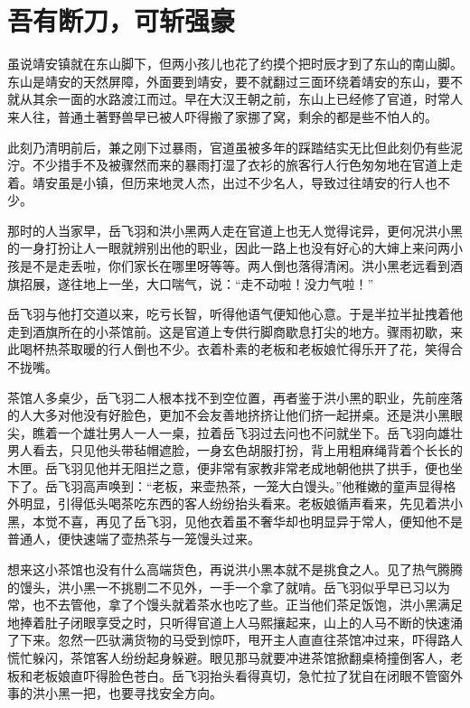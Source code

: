 
\chapter{吾有断刀，可斩强豪}
\label{chap:xiao-ban-dao}

虽说靖安镇就在东山脚下，但两小孩儿也花了约摸个把时辰才到了东山的南山脚。东山是靖安的天然屏障，外面要到靖安，要不就翻过三面环绕着靖安的东山，要不就从其余一面的水路渡江而过。早在大汉王朝之前，东山上已经修了官道，时常人来人往，普通土著野兽早已被人吓得搬了家挪了窝，剩余的都是些不怕人的。

此刻乃清明前后，兼之刚下过暴雨，官道虽被多年的踩踏结实无比但此刻仍有些泥泞。不少措手不及被骤然而来的暴雨打湿了衣衫的旅客行人行色匆匆地在官道上走着。靖安虽是小镇，但历来地灵人杰，出过不少名人，导致过往靖安的行人也不少。

那时的人当家早，岳飞羽和洪小黑两人走在官道上也无人觉得诧异，更何况洪小黑的一身打扮让人一眼就辨别出他的职业，因此一路上也没有好心的大婶上来问两小孩是不是走丢啦，你们家长在哪里呀等等。两人倒也落得清闲。洪小黑老远看到酒旗招展，遂往地上一坐，大口喘气，说：“走不动啦！没力气啦！”

岳飞羽与他打交道以来，吃亏长智，听得他语气便知他心意。于是半拉半扯拽着他走到酒旗所在的小茶馆前。这是官道上专供行脚商歇息打尖的地方。骤雨初歇，来此喝杯热茶取暖的行人倒也不少。衣着朴素的老板和老板娘忙得乐开了花，笑得合不拢嘴。

茶馆人多桌少，岳飞羽二人根本找不到空位置，再者鉴于洪小黑的职业，先前座落的人大多对他没有好脸色，更加不会友善地挤挤让他们挤一起拼桌。还是洪小黑眼尖，瞧着一个雄壮男人一人一桌，拉着岳飞羽过去问也不问就坐下。岳飞羽向雄壮男人看去，只见他头带毡帽遮脸，一身玄色胡服打扮，背上用粗麻绳背着个长长的木匣。岳飞羽见他并无阻拦之意，便非常有家教非常老成地朝他拱了拱手，便也坐下了。岳飞羽高声唤到：“老板，来壶热茶，一笼大白馒头。”他稚嫩的童声显得格外明显，引得低头喝茶吃东西的客人纷纷抬头看来。老板娘循声看来，先见着洪小黑，本觉不喜，再见了岳飞羽，见他衣着虽不奢华却也明显异于常人，便知他不是普通人，便快速端了壶热茶与一笼馒头过来。

想来这小茶馆也没有什么高端货色，再说洪小黑本就不是挑食之人。见了热气腾腾的馒头，洪小黑一不挑剔二不见外，一手一个拿了就啃。岳飞羽似乎早已习以为常，也不去管他，拿了个馒头就着茶水也吃了些。正当他们茶足饭饱，洪小黑满足地捧着肚子闭眼享受之时，只听得官道上人马熙攘起来，山上的人马不断的快速涌了下来。忽然一匹驮满货物的马受到惊吓，甩开主人直直往茶馆冲过来，吓得路人慌忙躲闪，茶馆客人纷纷起身躲避。眼见那马就要冲进茶馆掀翻桌椅撞倒客人，老板和老板娘直吓得脸色苍白。岳飞羽抬头看得真切，急忙拉了犹自在闭眼不管窗外事的洪小黑一把，也要寻找安全方向。


